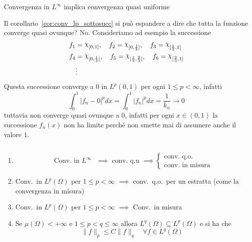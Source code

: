 \begin{remark}
    Convergenza in \(L^{\infty}\) implica convergenza quasi uniforme
\end{remark}

Il corollario~\ref{cor:conv_lp_sottosucc} si può espandere a dire che tutta la funzione converge quasi
ovunque? No. Consideriamo ad esempio la successione
\begin{align*}
    f_{1} &= \rchi_{[0, 1]}, \quad f_{2} = \rchi_{[0, \frac{1}{2}]}, \quad f_{3} =
    \rchi_{[\frac{1}{2}, 1]} \\
    f_{4} &= \rchi_{[0, \frac{1}{3}]}, \quad f_{5} = \rchi_{[\frac{1}{3},
    \frac{2}{3}]}, \quad f_{6} = \rchi_{[\frac{2}{3}, 1]} \\ 
          &\vdots
\end{align*}
Questa successione converge a \(0\) in \(L^{p}(0,1)\) per ogni \(1 \le p <
\infty\), infatti 
\[
    \int_{0}^{1} |f_{n} - 0|^{p} dx = \int_{0}^{1} |f_{n}|^{p} dx = \frac{1}{k_n}
    \to 0
\]
tuttavia non converge quasi ovunque a \(0\), infatti per ogni \(x \in (0, 1)\)
la successione \(f_{n}{(x)}\) non ha limite perché non smette mai di assumere
anche il valore \(1\).
\begin{proposition}[Convergenze] \( \) 
\begin{enumerate}[label = \arabic*.]
    \item \[
        \text{ Conv.~in \(L^{\infty}\)  } \implies \text{ conv.~q.u } \implies
        \begin{cases}
            \text{conv.~q.o.} \\
            \text{conv.~in misura}
        \end{cases}
    \]
    \item Conv.~in \(L^{p}{(\Omega)}\) per \(1 \le p< \infty\) \(\implies \)
        conv.~q.o.~per un estratta (come la convergenza in misura)
    \item Conv.~in \(L^{p}{(\Omega)}\) per \(1 \le p < \infty\) \(\implies\)
        Conv.~in misura
    \item Se \(\mu{(\Omega)} < +\infty\) e \(1 \le p < q \le \infty\) allora
        \(L^{q}{(\Omega)} \subseteq L^{p}{(\Omega)}\) e si ha che
        \[
            \|f\|_p \le C \|f\|_q \quad \forall f \in L^{q}{(\Omega)}
        \]
\end{enumerate}
\end{proposition}
